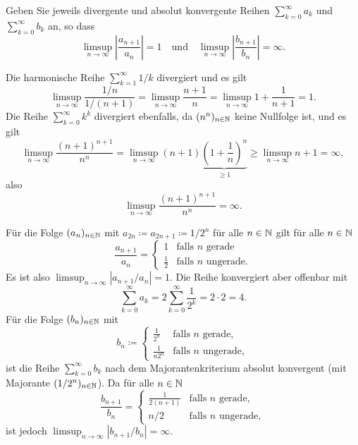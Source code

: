 \documentclass[a4paper,10pt]{article}
\begin{document}
\begin{question}
 Geben Sie jeweils divergente und absolut konvergente Reihen $\sum_{k=0}^\infty a_k$ und $\sum_{k=0}^\infty b_k$ an, so dass 
 \[
  \limsup_{n \to \infty} \left|\frac{a_{n+1}}{a_n}\right| = 1
  \quad
  \text{und}
  \quad
  \limsup_{n \to \infty} \left|\frac{b_{n+1}}{b_n}\right| = \infty.
 \]
\end{question}
\begin{solution}
 Die harmonische Reihe $\sum_{k=1}^\infty 1/k$ divergiert und es gilt
 \[
  \limsup_{n \to \infty} \frac{1/n}{1/(n+1)}
  = \limsup_{n \to \infty} \frac{n+1}{n}
  = \limsup_{n \to \infty} 1+\frac{1}{n+1}
  = 1.
 \]
 Die Reihe $\sum_{k=0}^\infty k^k$ divergiert ebenfalls, da $(n^n)_{n \in \mathbb{N}}$ keine Nullfolge ist, und es gilt
 \[
  \limsup_{n \to \infty} \frac{(n+1)^{n+1}}{n^n}
  = \limsup_{n \to \infty} (n+1) \underbrace{\left(1 + \frac{1}{n}\right)^n}_{\geq 1}
  \geq \limsup_{n \to \infty} n+1
  = \infty,
 \]
 also
 \[
  \limsup_{n \to \infty} \frac{(n+1)^{n+1}}{n^n} = \infty.
 \]

 Für die Folge $(a_n)_{n \in \mathbb{N}}$ mit $a_{2n} \coloneqq a_{2n+1} \coloneqq 1/2^n$ für alle $n \in \mathbb{N}$ gilt für alle $n \in \mathbb{N}$
 \[
  \frac{a_{n+1}}{a_n} =
  \begin{cases}
            1  & \text{falls $n$ gerade} \\
   \frac{1}{2} & \text{falls $n$ ungerade}.
  \end{cases}
 \]
 Es ist also $\limsup_{n \to \infty} |a_{n+1}/a_n| = 1$. Die Reihe konvergiert aber offenbar mit
 \[
  \sum_{k=0}^\infty a_k
  = 2 \sum_{k=0}^\infty \frac{1}{2^k}
  = 2 \cdot 2
  = 4.
 \]
 Für die Folge $(b_n)_{n \in \mathbb{N}}$ mit
 \[
  b_n \coloneqq
  \begin{cases}
     \frac{1}{2^n} & \text{falls $n$ gerade}, \\
   \frac{1}{n 2^n} & \text{falls $n$ ungerade},
  \end{cases}
 \]
 ist die Reihe $\sum_{k=0}^\infty b_k$ nach dem Majorantenkriterium absolut konvergent (mit Majorante $(1/2^n)_{n \in \mathbb{N}}$). Da für alle $n \in \mathbb{N}$
 \[
  \frac{b_{n+1}}{b_n} =
  \begin{cases}
   \frac{1}{2(n+1)} & \text{falls $n$ gerade}, \\
                n/2 & \text{falls $n$ ungerade},
  \end{cases}
 \]
 ist jedoch $\limsup_{n \to \infty} |b_{n+1}/b_n| = \infty$.
\end{solution}
\end{document}
